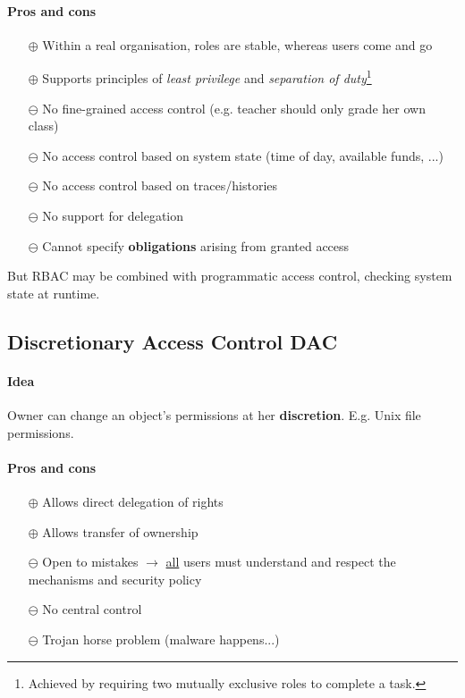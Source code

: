 \paragraph{Pros and cons}
\begin{itemize}
    \item[$\oplus$] Within a real organisation, roles are stable, whereas users come and go
    \item[$\oplus$] Supports principles of \emph{least privilege} and \emph{separation of duty}\footnote{Achieved by requiring two mutually exclusive roles to complete a task.}
    \item[$\ominus$] No fine-grained access control (e.g. teacher should only grade her own class)
    \item[$\ominus$] No access control based on system state (time of day, available funds, ...)
    \item[$\ominus$] No access control based on traces/histories
    \item[$\ominus$] No support for delegation
    \item[$\ominus$] Cannot specify \textbf{obligations} arising from granted access
\end{itemize}
But RBAC may be combined with programmatic access control, checking system state at runtime.


\subsection{Discretionary Access Control DAC}

\paragraph{Idea} Owner can change an object's permissions at her \textbf{discretion}. E.g. Unix file permissions.

\paragraph{Pros and cons}
\begin{itemize}
    \item[$\oplus$] Allows direct delegation of rights
    \item[$\oplus$] Allows transfer of ownership
    \item[$\ominus$] Open to mistakes $\rightarrow$ \underline{all} users must understand and respect the mechanisms and security policy
    \item[$\ominus$] No central control
    \item[$\ominus$] Trojan horse problem (malware happens...)
\end{itemize}


